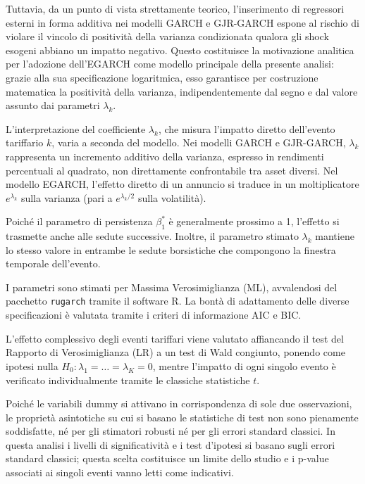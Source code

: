 Tuttavia, da un punto di vista strettamente teorico, l'inserimento di regressori esterni in forma additiva nei modelli GARCH e GJR-GARCH espone al rischio di violare 
il vincolo di positività della varianza condizionata qualora gli shock esogeni abbiano un impatto negativo. Questo costituisce la motivazione analitica per l'adozione 
dell'EGARCH come modello principale della presente analisi: grazie alla sua specificazione logaritmica, esso garantisce per costruzione matematica 
la positività della varianza, indipendentemente dal segno e dal valore assunto dai parametri $\lambda_k$.

L'interpretazione del coefficiente $\lambda_k$, che misura l'impatto diretto dell'evento tariffario $k$, varia a seconda del modello. Nei modelli GARCH e GJR-GARCH, 
$\lambda_k$ rappresenta un incremento additivo della varianza, espresso in rendimenti percentuali al quadrato, non direttamente confrontabile tra asset diversi. 
Nel modello EGARCH, l'effetto diretto di un annuncio si traduce in un moltiplicatore $e^{\lambda_k}$ sulla varianza (pari a $e^{\lambda_k/2}$ sulla volatilità).

Poiché il parametro di persistenza $\beta_1^*$ è generalmente prossimo a 1, l'effetto si trasmette anche alle sedute successive. Inoltre, il parametro 
stimato $\lambda_k$ mantiene lo stesso valore in entrambe le sedute borsistiche che compongono la finestra temporale dell'evento.

I parametri sono stimati per Massima Verosimiglianza (ML), avvalendosi del pacchetto \texttt{rugarch} tramite il software R. La bontà di adattamento 
delle diverse specificazioni è valutata tramite i criteri di informazione AIC e BIC. 


L'effetto complessivo degli eventi tariffari viene valutato affiancando il test del Rapporto di Verosimiglianza (LR) a
un test di Wald congiunto, ponendo come ipotesi nulla $H_0: \lambda_1 = \dots = \lambda_K = 0$, mentre l'impatto di ogni  
singolo evento è verificato individualmente tramite le classiche statistiche $t$.

Poiché le variabili dummy si attivano in corrispondenza di sole due osservazioni, le proprietà asintotiche su cui si basano le statistiche 
di test non sono pienamente soddisfatte, né per gli stimatori robusti né per gli errori standard classici. In questa analisi i livelli di 
significatività e i test d'ipotesi si basano sugli errori standard classici; questa scelta costituisce un limite dello studio e i p-value associati ai 
singoli eventi vanno letti come indicativi.


